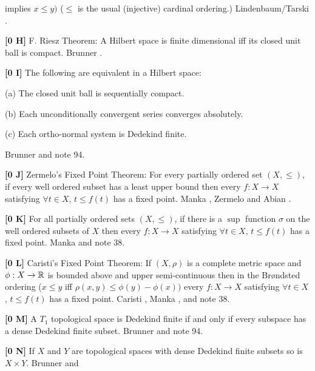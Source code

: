 implies $x\le y)$ ($\le $ is the usual (injective) cardinal ordering.)
\ac{Lindenbaum/Tarski} \cite{1926}.
\smallskip
\item{}{\bf [0 H]}  F. Riesz Theorem:  A Hilbert space is finite
dimensional iff its closed unit ball is compact. \ac{Brunner} \cite{1983b}.
\smallskip
\item{}{\bf [0 I]}  The following are equivalent in a  Hilbert  space:
\item\item{}{(a)} The closed unit  ball  is  sequentially compact.
\item\item{}{(b)} Each unconditionally convergent series converges
absolutely.
\item\item{}{(c)} Each ortho-normal system is Dedekind finite.
\item{} \ac{Brunner} \cite{1983b} and note 94.
\smallskip
\item{}{\bf [0 J]}  Zermelo's Fixed Point Theorem:  For every partially
ordered set $(X,\le)$, if every well ordered subset has a least
upper bound then every $f: X\rightarrow X$ satisfying $\forall t\in
X$, $t\le f(t)$ has a fixed point.  \ac{Manka} \cite{1988a}, \ac{Zermelo}
\cite{1908b} and \ac{Abian} \cite{1980}. 
\smallskip
\item{}{\bf [0 K]}  For all partially ordered sets $(X,\le)$, if there
is a $\sup$ function $\sigma$ on the well ordered subsets of $X$ then
every $f: X\rightarrow X$ satisfying $\forall t\in X$, $t\le f(t)$ has a
fixed point.  \ac{Manka} \cite{1988a} and note 38.
\smallskip
\item{}{\bf [0 L]}  Caristi's Fixed Point Theorem:  If $(X,\rho)$ is a
complete metric space and $\phi : X\rightarrow{\Bbb R}$ is bounded
above and upper semi-continuous then in the Br\o ndsted  ordering
($x\le y$ iff $\rho(x,y)\le\phi(y) - \phi(x))$ every $f: X\rightarrow X$
satisfying $\forall t\in X$, $t\le f(t)$ has a fixed point.
\ac{Caristi} \cite{1976}, \ac{Manka} \cite{1988a}, and note 38.
\smallskip
\item{}{\bf [0 M]} A $T_1$ topological space is Dedekind finite if and only
if every subspace has a dense Dedekind finite subset. \ac{Brunner}
\cite{1982d} and note 94.
\smallskip
\item{}{\bf [0 N]}  If $X$ and $Y$ are topological spaces with dense
Dedekind finite subsets so is $X\times Y$.  \ac{Brunner} \cite{1982d} and
